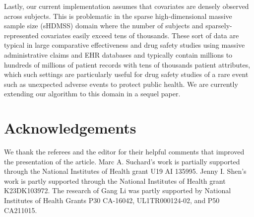 Lastly, our current implementation assumes that covariates are densely observed across subjects. This is problematic in the sparse high-dimensional massive sample size (sHDMSS) domain \citep{mittal2013high} where the number of subjects and sparsely-represented covariates easily exceed tens of thousands. These sort of data are typical in large comparative effectiveness and drug safety studies using massive administrative claims and EHR databases and typically contain millions to hundreds of millions of
patient records with tens of thousands patient attributes,
which such settings are particularly useful  for drug safety studies of a rare event such as unexpected adverse events 
\citep{schuemie2018improving} to protect public health. We are currently extending our algorithm to this domain in a sequel paper. 


\section{Acknowledgements}
We thank the referees and the editor for their helpful comments that improved the presentation of the article.
Marc A. Suchard's work is partially supported through the National Institutes of Health grant U19 AI 135995. Jenny I. Shen's work is partly supported through the National Institutes of Health grant K23DK103972. The research of Gang Li was partly supported by National Institutes of Health Grants P30 CA-16042, UL1TR000124-02, and P50 CA211015.


%



\newpage

